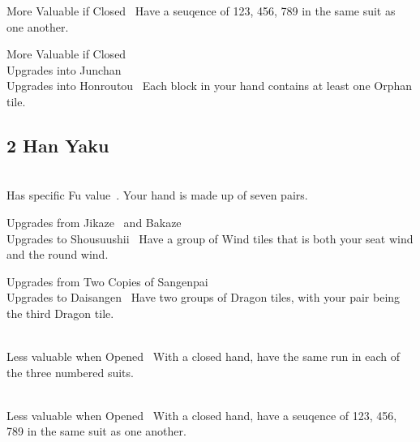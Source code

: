 	{\morevaluable More Valuable if Closed~}
	{Have a seuqence of 123, 456, 789 in the same suit as one another.}

	{\morevaluable More Valuable if Closed~\\
	\upgradesto Upgrades into Junchan~\\
	\upgradesto Upgrades into Honroutou~}
	{Each block in your hand contains at least one Orphan tile.}


\subsection{2 Han Yaku}\label{core:ssec:2-han-yaku}

	{\closedhand \\
	\upgradestoother Has specific Fu value~.}
	{Your hand is made up of seven pairs.}

	{\upgradesfrom Upgrades from Jikaze~ and Bakaze~\\
	\upgradesto Upgrades to Shousuushii~}
	{Have a group of Wind tiles that is both your seat wind and the round wind.}

	{\upgradesfrom Upgrades from Two Copies of Sangenpai~\\ 
	\upgradesto Upgrades to Daisangen~}
	{Have two groups of Dragon tiles, with your pair being the third Dragon tile.}

	{\closedhand \\ 
	\lessvaluable Less valuable when Opened~}
	{With a closed hand, have the same run in each of the three numbered suits.}

	{\closedhand \\
	\lessvaluable Less valuable when Opened~}
	{With a closed hand, have a seuqence of 123, 456, 789 in the same suit as one another.}

